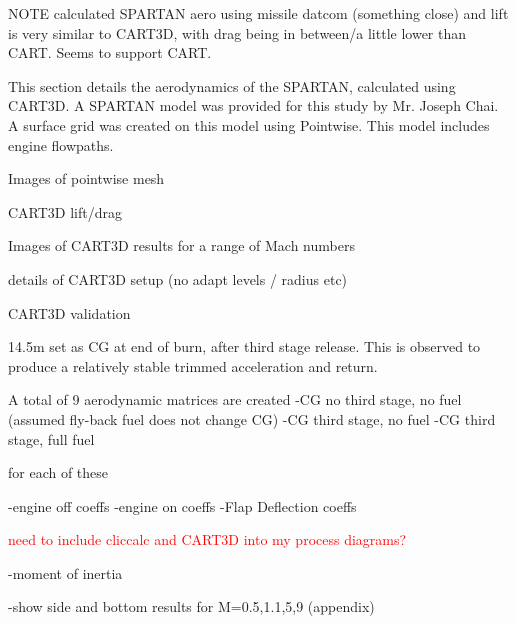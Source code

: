   NOTE calculated SPARTAN aero using missile datcom (something close) and lift is very similar to CART3D, with drag being in between/a little lower than CART. Seems to support CART. 
  
  
This section details the aerodynamics of the SPARTAN, calculated using CART3D. A SPARTAN model was provided for this study by Mr. Joseph Chai. A surface grid was created on this model using Pointwise\cite{Pointwise}. This model includes engine flowpaths. 

Images of pointwise mesh

CART3D lift/drag 

Images of CART3D results for a range of Mach numbers

details of CART3D setup (no adapt levels / radius etc)

CART3D validation



14.5m set as CG at end of burn, after third stage release. This is observed to produce a relatively stable trimmed acceleration and return. 

A total of 9 aerodynamic matrices are created
-CG no third stage, no fuel (assumed fly-back fuel does not change CG)
-CG third stage, no fuel
-CG third stage, full fuel

for each of these

-engine off coeffs
-engine on coeffs
-Flap Deflection coeffs

\textcolor{red}{need to include cliccalc and CART3D into my process diagrams?}


-moment of inertia

-show side and bottom results for M=0.5,1.1,5,9 (appendix)

